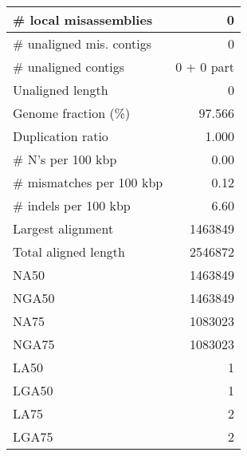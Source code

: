 \documentclass[12pt,a4paper]{article}
\begin{document}
\begin{table}[ht]
\begin{center}
\begin{tabular}{|l*{1}{|r}|}
\# local misassemblies & 0 \\ \hline
\# unaligned mis. contigs & 0 \\ \hline
\# unaligned contigs & 0 + 0 part \\ \hline
Unaligned length & 0 \\ \hline
Genome fraction (\%) & 97.566 \\ \hline
Duplication ratio & 1.000 \\ \hline
\# N's per 100 kbp & 0.00 \\ \hline
\# mismatches per 100 kbp & 0.12 \\ \hline
\# indels per 100 kbp & 6.60 \\ \hline
Largest alignment & 1463849 \\ \hline
Total aligned length & 2546872 \\ \hline
NA50 & 1463849 \\ \hline
NGA50 & 1463849 \\ \hline
NA75 & 1083023 \\ \hline
NGA75 & 1083023 \\ \hline
LA50 & 1 \\ \hline
LGA50 & 1 \\ \hline
LA75 & 2 \\ \hline
LGA75 & 2 \\ \hline
\end{tabular}
\end{center}
\end{table}
\end{document}
